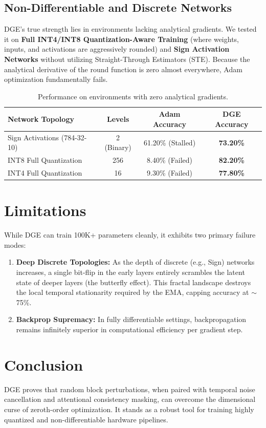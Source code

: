 \documentclass[11pt, a4paper]{article}
\begin{document}
\subsection{Non-Differentiable and Discrete Networks}
DGE's true strength lies in environments lacking analytical gradients. We tested it on \textbf{Full INT4/INT8 Quantization-Aware Training} (where weights, inputs, and activations are aggressively rounded) and \textbf{Sign Activation Networks} without utilizing Straight-Through Estimators (STE). Because the analytical derivative of the round function is zero almost everywhere, Adam optimization fundamentally fails.

\begin{table}[h]
\centering
\begin{tabular}{@{}lccc@{}}
\toprule
\textbf{Network Topology} & \textbf{Levels} & \textbf{Adam Accuracy} & \textbf{DGE Accuracy} \\ \midrule
Sign Activations (784-32-10) & 2 (Binary) & 61.20\% (Stalled) & \textbf{73.20\%} \\
INT8 Full Quantization & 256 & 8.40\% (Failed) & \textbf{82.20\%} \\
INT4 Full Quantization & 16 & 9.30\% (Failed) & \textbf{77.80\%} \\ \bottomrule
\end{tabular}
\caption{Performance on environments with zero analytical gradients.}
\end{table}

\section{Limitations}
While DGE can train 100K+ parameters cleanly, it exhibits two primary failure modes:
\begin{enumerate}
    \item \textbf{Deep Discrete Topologies:} As the depth of discrete (e.g., Sign) networks increases, a single bit-flip in the early layers entirely scrambles the latent state of deeper layers (the butterfly effect). This fractal landscape destroys the local temporal stationarity required by the EMA, capping accuracy at $\sim$75\%.
    \item \textbf{Backprop Supremacy:} In fully differentiable settings, backpropagation remains infinitely superior in computational efficiency per gradient step.
\end{enumerate}

\section{Conclusion}
DGE proves that random block perturbations, when paired with temporal noise cancellation and attentional consistency masking, can overcome the dimensional curse of zeroth-order optimization. It stands as a robust tool for training highly quantized and non-differentiable hardware pipelines.
\end{document}
